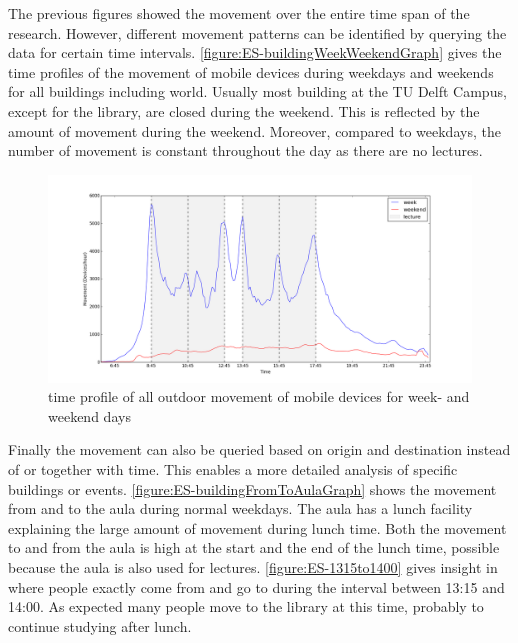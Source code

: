 The previous figures showed the movement over the entire time span of the research. However, different movement patterns can be identified by querying the data for certain time intervals. \autoref{figure:ES-buildingWeekWeekendGraph} gives the time profiles of the movement of mobile devices during weekdays and weekends for all buildings including world. Usually most building at the TU Delft Campus, except for the library, are closed during the weekend. This is reflected by the amount of movement during the weekend. Moreover, compared to weekdays, the number of movement is constant throughout the day as there are no lectures.

\begin{figure}[H]
\centering
\includegraphics[scale=0.2]{building_weekWeekend_graph.png}
\captionsetup{justification=centering}
\caption{time profile of all outdoor movement of mobile devices for week- and weekend days}
\label{figure:ES-buildingWeekWeekendGraph}
\end{figure}

Finally the movement can also be queried based on origin and destination instead of or together with time. This enables a more detailed analysis of specific buildings or events. \autoref{figure:ES-buildingFromToAulaGraph} shows the movement from and to the aula during normal weekdays. The aula has a lunch facility explaining the large amount of movement during lunch time. Both the movement to and from the aula is high at the start and the end of the lunch time, possible because the aula is also used for lectures. \autoref{figure:ES-1315to1400} gives insight in where people exactly come from and go to during the interval between 13:15 and 14:00. As expected many people move to the library at this time, probably to continue studying after lunch. 

